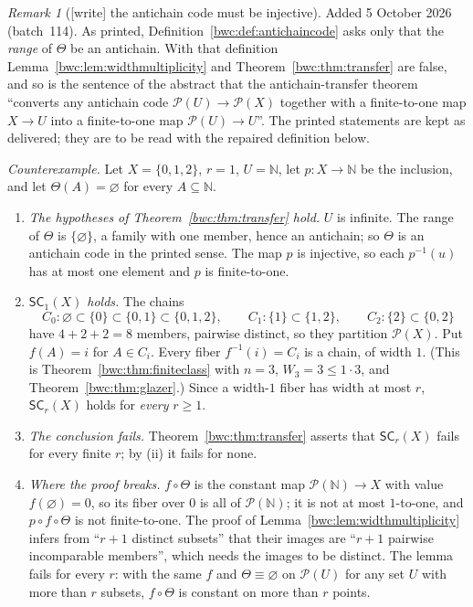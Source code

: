 \documentclass[11pt,letterpaper]{article}
\numberwithin{equation}{section}
\theoremstyle{plain}
\theoremstyle{definition}
\theoremstyle{remark}
\newtheorem{remark}[remark]{Remark}
\newcommand{\Pow}{\mathcal P}
\newcommand{\NN}{\mathbb N}
\newcommand{\SC}{\mathsf{SC}}
\begin{document}
\begin{remark}[{[write]} the antichain code must be injective]\label{bwc:rem:injective}
Added 5 October 2026 (batch~114). As printed,
Definition~\ref{bwc:def:antichaincode} asks only that the \emph{range} of
$\Theta$ be an antichain. With that definition
Lemma~\ref{bwc:lem:widthmultiplicity} and Theorem~\ref{bwc:thm:transfer} are
false, and so is the sentence of the abstract that the antichain-transfer
theorem ``converts any antichain code $\Pow(U)\to\Pow(X)$ together with a
finite-to-one map $X\to U$ into a finite-to-one map $\Pow(U)\to U$''. The
printed statements are kept as delivered; they are to be read with the
repaired definition below.

\emph{Counterexample.} Let $X=\{0,1,2\}$, $r=1$, $U=\NN$, let $p:X\to\NN$ be
the inclusion, and let $\Theta(A)=\varnothing$ for every $A\subseteq\NN$.
\begin{enumerate}[label=(\roman*)]
\item \emph{The hypotheses of Theorem~\ref{bwc:thm:transfer} hold.} $U$ is
 infinite. The range of $\Theta$ is $\{\varnothing\}$, a family with one
 member, hence an antichain; so $\Theta$ is an antichain code in the printed
 sense. The map $p$ is injective, so each $p^{-1}(u)$ has at most one element
 and $p$ is finite-to-one.
\item \emph{$\SC_1(X)$ holds.} The chains
 \[
 C_0:\varnothing\subset\{0\}\subset\{0,1\}\subset\{0,1,2\},\qquad
 C_1:\{1\}\subset\{1,2\},\qquad
 C_2:\{2\}\subset\{0,2\}
 \]
 have $4+2+2=8$ members, pairwise distinct, so they partition $\Pow(X)$. Put
 $f(A)=i$ for $A\in C_i$. Every fiber $f^{-1}(i)=C_i$ is a chain, of width
 $1$. (This is Theorem~\ref{bwc:thm:finiteclass} with $n=3$,
 $W_3=3\leq1\cdot3$, and Theorem~\ref{bwc:thm:glazer}.) Since a width-$1$
 fiber has width at most $r$, $\SC_r(X)$ holds for \emph{every} $r\geq1$.
\item \emph{The conclusion fails.} Theorem~\ref{bwc:thm:transfer} asserts that
 $\SC_r(X)$ fails for every finite $r$; by (ii) it fails for none.
\item \emph{Where the proof breaks.} $f\circ\Theta$ is the constant map
 $\Pow(\NN)\to X$ with value $f(\varnothing)=0$, so its fiber over $0$ is all
 of $\Pow(\NN)$; it is not at most $1$-to-one, and $p\circ f\circ\Theta$ is
 not finite-to-one. The proof of Lemma~\ref{bwc:lem:widthmultiplicity} infers
 from ``$r+1$ distinct subsets'' that their images are ``$r+1$ pairwise
 incomparable members'', which needs the images to be distinct. The lemma
 fails for every $r$: with the same $f$ and $\Theta\equiv\varnothing$ on
 $\Pow(U)$ for any set $U$ with more than $r$ subsets, $f\circ\Theta$ is
 constant on more than $r$ points.
\end{enumerate}


\end{remark}
\end{document}
